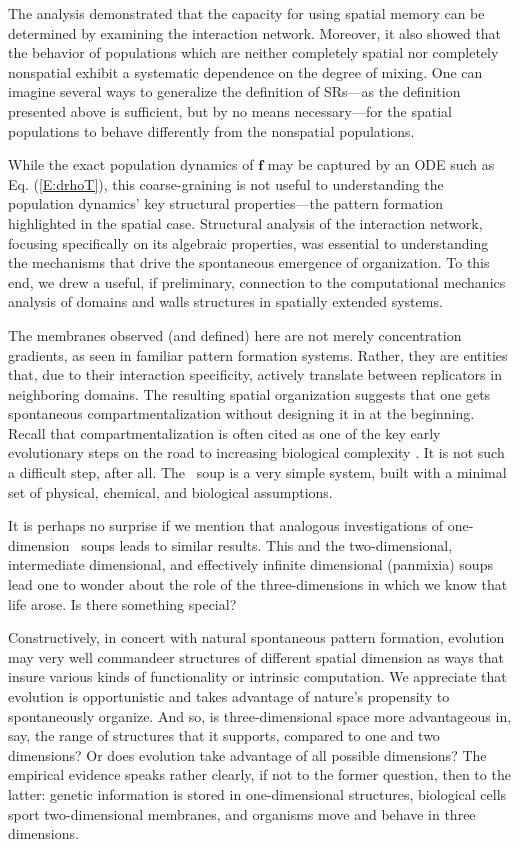 \documentclass[pre,twocolumn,showpacs,superscriptaddress,preprintnumbers,floatfix]{revtex4}
\theoremstyle{plain}    \newtheorem{Lem}{Lemma}
\theoremstyle{plain}    \newtheorem*{ProLem}{Proof}
\theoremstyle{plain}    \newtheorem{Cor}{Corollary}
\theoremstyle{plain}    \newtheorem*{ProCor}{Proof}
\theoremstyle{plain}    \newtheorem{The}{Theorem}
\theoremstyle{plain}    \newtheorem*{ProThe}{Proof}
\theoremstyle{plain}    \newtheorem{Prop}{Proposition}
\theoremstyle{plain}    \newtheorem*{ProProp}{Proof}
\theoremstyle{plain}    \newtheorem*{Conj}{Conjecture}
\theoremstyle{plain}    \newtheorem*{Rem}{Remark}
\theoremstyle{plain}    \newtheorem{Def}{Definition}
\theoremstyle{plain}    \newtheorem*{Not}{Notation}
\newcommand{\PrEMType}{\mathbf{f}}
\begin{document}
The analysis demonstrated that the capacity for using spatial memory can be
determined by examining the interaction network. Moreover, it also showed
that the behavior of populations which are neither completely spatial nor
completely nonspatial exhibit a systematic dependence on the degree of mixing.
One can imagine several ways to generalize the definition of SRs---as the
definition presented above is sufficient, but by no means necessary---for the
spatial populations to behave differently from the nonspatial populations.

While the exact population dynamics of $\PrEMType$ may be captured by an ODE
such as Eq. (\ref{E:drhoT}), this coarse-graining is not useful to understanding
the population dynamics' key structural properties---the pattern formation
highlighted in the spatial case. Structural analysis of the interaction network,
focusing
specifically on its algebraic properties, was essential to understanding the
mechanisms that drive the spontaneous emergence of organization. To this end,
we drew a useful, if preliminary, connection to the computational mechanics
analysis of domains and walls structures in spatially extended systems.

The membranes observed (and defined) here are not merely concentration
gradients, as seen in familiar pattern formation systems. Rather, they are
entities that, due to their interaction specificity, actively translate between
replicators in neighboring domains. The resulting spatial organization suggests
that one gets spontaneous compartmentalization without designing it in at the
beginning. Recall that compartmentalization is often cited as one of the key
early evolutionary steps on the road to increasing biological complexity
\cite{Mayn95a}. It is not such a difficult step, after all. The \eM\ soup is a
very simple system, built with a minimal set of physical, chemical, and
biological assumptions.

It is perhaps no surprise if we mention that analogous investigations of
one-dimension \eM\ soups leads to similar results. This and the two-dimensional,
intermediate dimensional, and effectively infinite dimensional (panmixia)
soups lead one to wonder about the role of the three-dimensions in which
we know that life arose. Is there something special?

Constructively, in concert with natural spontaneous pattern formation, evolution
may very well commandeer structures of different spatial dimension as ways that
insure various kinds of functionality or intrinsic computation. We appreciate
that evolution is opportunistic and takes advantage of nature's propensity to
spontaneously organize. And so, is three-dimensional space more advantageous
in, say, the range of structures that it supports, compared to one and two
dimensions? Or does evolution take advantage of all possible dimensions?
The empirical evidence speaks rather clearly, if not to the former question,
then to the latter: genetic information is stored in one-dimensional structures,
biological cells sport two-dimensional membranes, and organisms move and
behave in three dimensions.
\end{document}
